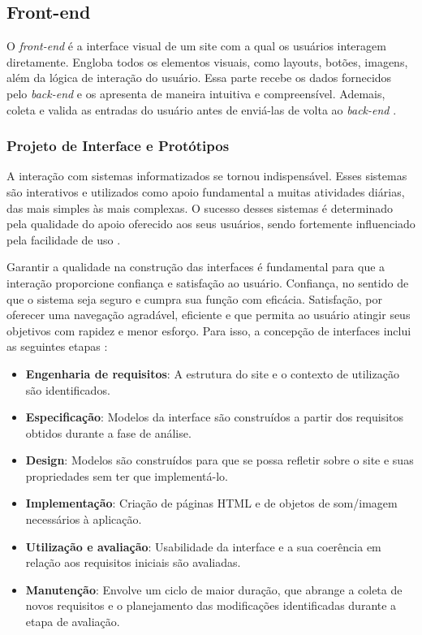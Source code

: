 \subsection{Front-end}

O \textit{front-end} é a interface visual de um site com a qual os usuários interagem diretamente. Engloba todos os elementos visuais, como layouts, botões, imagens, além da lógica de interação do usuário. Essa parte recebe os dados fornecidos pelo \textit{back-end} e os apresenta de maneira intuitiva e compreensível. Ademais, coleta e valida as entradas do usuário antes de enviá-las de volta ao \textit{back-end} \cite{garcia2024plataforma}.

\subsubsection{Projeto de Interface e Protótipos}

A interação com sistemas informatizados se tornou indispensável. Esses sistemas são interativos e utilizados como apoio fundamental a muitas atividades diárias, das mais simples às mais complexas. O sucesso desses sistemas é determinado pela qualidade do apoio oferecido aos seus usuários, sendo fortemente influenciado pela facilidade de uso \cite{miletto2014desenvolvimento}.

Garantir a qualidade na construção das interfaces é fundamental para que a interação proporcione confiança e satisfação ao usuário. Confiança, no sentido de que o sistema seja seguro e cumpra sua função com eficácia. Satisfação, por oferecer uma navegação agradável, eficiente e que permita ao usuário atingir seus objetivos com rapidez e menor esforço. Para isso, a concepção de interfaces inclui as seguintes etapas \cite{miletto2014desenvolvimento}:
\begin{itemize}
    \item \textbf{Engenharia de requisitos}: A estrutura do site e o contexto de utilização são identificados.
    \item \textbf{Especificação}: Modelos da interface são construídos a partir dos requisitos obtidos durante a fase de análise.
    \item \textbf{Design}: Modelos são construídos para que se possa refletir sobre o site e suas propriedades sem ter que implementá-lo.
    \item \textbf{Implementação}: Criação de páginas HTML e de objetos de som/imagem necessários à aplicação.
    \item \textbf{Utilização e avaliação}: Usabilidade da interface e a sua coerência em relação aos requisitos iniciais são avaliadas.
    \item \textbf{Manutenção}: Envolve um ciclo de maior duração, que abrange a coleta de novos requisitos e o planejamento das modificações identificadas durante a etapa de avaliação.
\end{itemize}

